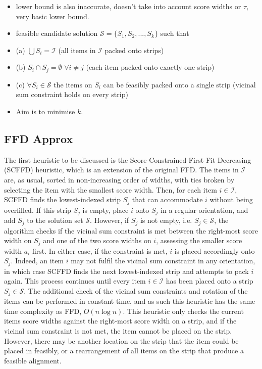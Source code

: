\documentclass[oribibl]{llncs}
\begin{document}
\begin{itemize}
	\item lower bound is also inaccurate, doesn't take into account score widths or $\tau$, very basic lower bound.
	\item feasible candidate solution $\mathcal{S} = \{S_1, S_2,...,S_k\}$ such that
	\item (a) $\bigcup S_i = \mathcal{I}$ (all items in $\mathcal{I}$ packed onto strips)
	\item (b) $S_i \cap S_j = \emptyset$ $\forall i\neq j$ (each item packed onto exactly one strip)
	\item (c) $\forall S_i \in \mathcal{S}$ the items on $S_i$ can be feasibly packed onto a single strip (vicinal sum constraint holds on every strip)
	\item Aim is to minimise $k$.
\end{itemize}


\subsection{FFD Approx}
\label{sec:ffdapprox}
The first heuristic to be discussed is the Score-Constrained First-Fit Decreasing (SCFFD) heuristic, which is an extension of the original FFD. The items in $\mathcal{I}$ are, as usual, sorted in non-increasing order of widths, with ties broken by selecting the item with the smallest score width. Then, for each item $i \in \mathcal{I}$, SCFFD finds the lowest-indexed strip $S_j$ that can accommodate $i$ without being overfilled. If this strip $S_j$ is empty, place $i$ onto $S_j$ in a regular orientation, and add $S_j$ to the solution set $\mathcal{S}$. However, if $S_j$ is not empty, i.e. $S_j \in \mathcal{S}$, the algorithm checks if the vicinal sum constraint is met between the right-most score width on $S_j$ and one of the two score widths on $i$, assessing the smaller score width $a_i$ first. In either case, if the constraint is met, $i$ is placed accordingly onto $S_j$. Indeed, an item $i$ may not fulfil the vicinal sum constraint in any orientation, in which case SCFFD finds the next lowest-indexed strip and attempts to pack $i$ again. This process continues until every item $i \in \mathcal{I}$ has been placed onto a strip $S_j \in \mathcal{S}$. The additional check of the vicinal sum constraints and rotation of the items can be performed in constant time, and as such this heuristic has the same time complexity as FFD, $O(n \log n)$. This heuristic only checks the current items score widths against the right-most score width on a strip, and if the vicinal sum constraint is not met, the item cannot be placed on the strip. However, there may be another location on the strip that the item could be placed in feasibly, or a rearrangement of all items on the strip that produce a feasible alignment.
\end{document}
